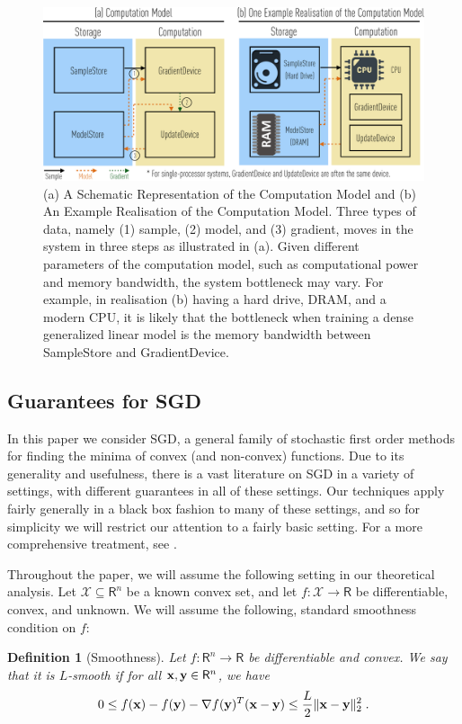 \documentclass{article}
\newcommand{\R}{\mathsf{R}}
\def\x{{\bf x}}
\def\y{{\bf y}}
\newtheorem{definition}{Definition}
\begin{document}
\begin{figure}[t]
\centering   
\includegraphics[scale=0.4]{compmodel-pdfcrop}
\caption{(a) A Schematic Representation of the Computation Model and (b) An Example Realisation
of the Computation Model. Three types of
data, namely (1) sample, (2) model, and (3)
gradient, moves in the system in three
steps as illustrated in (a). Given
different parameters of the computation model,
such as computational power and memory bandwidth, the system bottleneck may
vary. For example, in 
realisation (b) having a hard drive, DRAM, and a
modern CPU, it is likely that the  bottleneck when training 
a dense generalized linear model is the
memory bandwidth between SampleStore
and GradientDevice.}
\label{fig:model}
\end{figure}






%   
%    

\subsection{Guarantees for SGD}
In this paper we consider SGD, a general family of stochastic first order methods for finding the minima of convex (and non-convex) functions.
Due to its generality and usefulness, there is a vast literature on SGD in a variety of settings, with different guarantees in all of these settings.
Our techniques apply fairly generally in a black box fashion to many of these settings, and so for simplicity we will restrict our attention to a fairly basic setting.
For a more comprehensive treatment, see \cite{bubeck2015convex}.

Throughout the paper, we will assume the following setting in our theoretical analysis.
Let $\mathcal{X} \subseteq \R^n$ be a known convex set, and let $f: \mathcal{X} \to \R$ be differentiable, convex, and unknown.
We will assume the following, standard smoothness condition on $f$:
\begin{definition}[Smoothness]
Let $f: \R^n \to \R$ be differentiable and convex.
We say that it is $L$-smooth if for all $\x, \y \in \R^n$, we have
\[0 \leq f(\x) - f(\y) - \nabla f(\y)^T (\x - \y) \leq \frac{L}{2} \| \x - \y \|_2^2 \; .\]
\end{definition}
\end{document}
